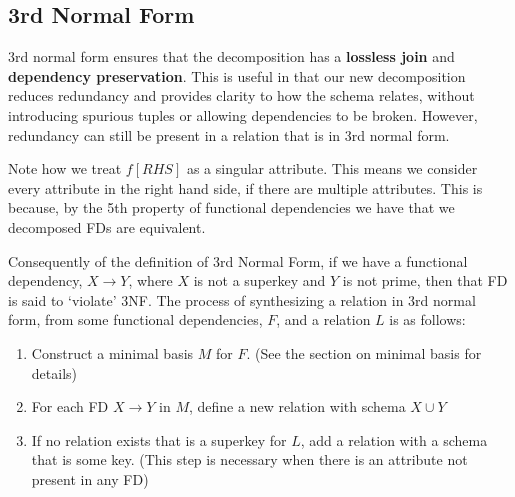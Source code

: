 \documentclass{report}
\begin{document}
        
        \subsection{3rd Normal Form} 

        3rd normal form ensures that the decomposition has a \textbf{lossless join} and \textbf{dependency preservation}. This is useful in that our new decomposition reduces redundancy and provides clarity to how the schema relates, without introducing spurious tuples or allowing dependencies to be broken. However, redundancy can still be present in a relation that is in 3rd normal form. 
        \vspace{.5cm}
         

        \vspace{.5cm}
         
        \begin{note}
            Note how we treat $f [RHS]$ as a singular attribute. This means we consider every attribute in the right hand side, if there are multiple attributes. This is because, by the 5th property of functional dependencies we have that we decomposed FDs are equivalent.
        \end{note}
        \vspace{.5cm}
         

    Consequently of the definition of 3rd Normal Form, if we have a functional dependency, $X \rightarrow Y$, where $X$ is not a superkey and $Y$ is not prime, then that FD is said to `violate' 3NF. The process of synthesizing a relation in 3rd normal form, from some functional dependencies, $F$, and a relation $L$ is as follows:
    \begin{enumerate}
        \item Construct a minimal basis $M$ for $F$. (See the section on minimal basis for details)
        \item For each FD $X\rightarrow Y$ in $M$, define a new relation with schema $X \cup Y$
        \item If no relation exists that is a superkey for $L$, add a relation with a schema that is some key. (This step is necessary when there is an attribute not present in any FD)
    \end{enumerate}
\end{document}
